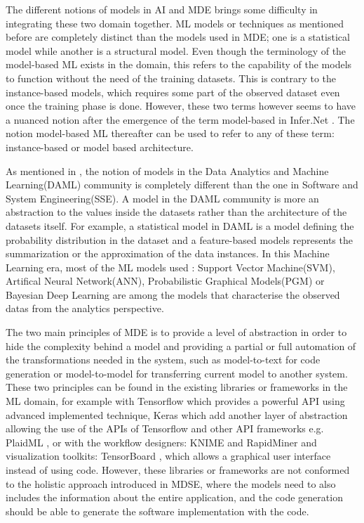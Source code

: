 The different notions of models in AI and MDE brings some difficulty in integrating these two domain together. ML models or techniques as mentioned before are completely distinct than the models used in MDE; one is a statistical model while another is a structural model. Even though the terminology of the model-based ML exists in the domain, this refers to the capability of the models to function without the need of the training datasets. This is contrary to the instance-based models, which requires some part of the observed dataset even once the training phase is done. However, these two terms however seems to have a nuanced notion after the emergence of the term model-based in Infer.Net \cite{inferNet}. The notion model-based ML thereafter can be used to refer to any of these term: instance-based or model based architecture.

As mentioned in \cite{mdApproach}, the notion of models in the Data Analytics and Machine Learning(DAML) community is completely different than the one in Software and System Engineering(SSE). A model in the DAML community is more an abstraction to the values inside the datasets rather than the architecture of the datasets itself. For example, a statistical model in DAML is a model defining the probability distribution in the dataset and a feature-based models represents the summarization or the approximation of the data instances. In this Machine Learning era, most of the ML models used : Support Vector Machine(SVM), Artifical Neural Network(ANN), Probabilistic Graphical Models(PGM) or Bayesian Deep Learning are among the models that characterise the observed datas from the analytics perspective. 

The two main principles of MDE is to provide a level of abstraction in order to hide the complexity behind a model and providing a partial or full automation of the transformations needed in the system, such as model-to-text for code generation or model-to-model for transferring current model to another system. These two principles can be found in the existing libraries or frameworks in the ML domain, for example with Tensorflow \cite{tensorflow} which provides a powerful API using advanced implemented technique, Keras \cite{keras} which add another layer of abstraction allowing the use of the APIs of Tensorflow and other API frameworks e.g. PlaidML \cite{plaidML}, or with the workflow designers: KNIME \cite{knime} and RapidMiner \cite{rapidminer} and visualization toolkits: TensorBoard \cite{tensorboard}, which allows a graphical user interface instead of using code. 
However, these libraries or frameworks are not conformed to the holistic approach introduced in MDSE, where the models need to also includes the information about the entire application, and the code generation should be able to generate the software implementation with the code.

